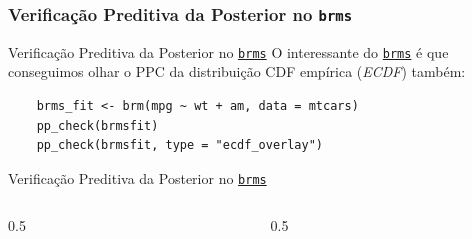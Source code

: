 \subsubsection{Verificação Preditiva da Posterior no \texttt{brms}}
\begin{frame}[fragile]{Verificação Preditiva da Posterior no \href{https://paul-buerkner.github.io/brms/}{\texttt{brms}}}
    O interessante do \href{https://paul-buerkner.github.io/brms/}{\texttt{brms}} é
    que conseguimos olhar o PPC da distribuição CDF empírica (\textit{ECDF}) também:
    \vfill
    \begin{lstlisting}
    brms_fit <- brm(mpg ~ wt + am, data = mtcars)
    pp_check(brmsfit)
    pp_check(brmsfit, type = "ecdf_overlay")
    \end{lstlisting}
\end{frame}

\begin{frame}{Verificação Preditiva da Posterior no \href{https://paul-buerkner.github.io/brms/}{\texttt{brms}}}
\begin{columns}
    \begin{column}{0.5\textwidth}
        \begin{figure}
            \centering
            \resizebox{0.8\columnwidth}{!}{}
        \end{figure}
    \end{column}
    \begin{column}{0.5\textwidth}
        \begin{figure}
        \centering
            \resizebox{0.8\columnwidth}{!}{}
        \end{figure}
    \end{column}
\end{columns}
\end{frame}
